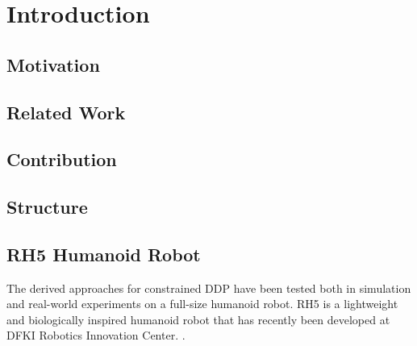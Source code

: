 
\chapter{Introduction}\label{c1}
\section{Motivation}
\section{Related Work}
\section{Contribution}
\section{Structure}


\section{RH5 Humanoid Robot}
The derived approaches for constrained \gls{DDP} have been tested both in simulation and real-world experiments on a full-size humanoid robot. RH5 is a lightweight and biologically inspired humanoid robot that has recently been developed at DFKI Robotics Innovation Center.  \cite{peters2017konstruktion}.

